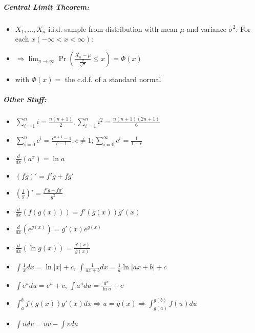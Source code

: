 \documentclass[landscape,10pt]{article}
\begin{document}
\begin{multicols}{4}
\subparagraph*{Central Limit Theorem:}
\begin{itemize}
    \item[] \(X_1,\ldots,X_n\) i.i.d. sample from distribution with mean \(\mu\) and variance \(\sigma^2\). For each \(x (-\infty < x < \infty):\)
    \item[] \(\Rightarrow \lim_{n \to \infty} \Pr \left( \frac{ \bar{X_n} - \mu }{ \frac{ \sigma }{ \sqrt{n} } }  \leq x \right) = \Phi(x)\)
    \item[] with \(\Phi(x) =\) the c.d.f. of a standard normal
\end{itemize}

    \subparagraph*{Other Stuff:}
    \begin{itemize}
        \item[] \(\sum\limits_{i=1}^{n}i = \frac{n(n+1)}{2},\sum\limits_{i=1}^{n}i^2 = \frac{n(n+1)(2n+1)}{6}\)
        \item[] \(\sum\limits_{i=0}^{n}c^i = \frac{c^{n+1}-1}{c-1}, c \neq 1; \sum\limits_{i=0}^{\infty}c^i = \frac{1}{1-c}\)
        \item[] \(\frac{d}{dx}(a^x) = \ln a\)
        \item[] \((fg)' = f'g + fg'\)
        \item[] \(\left(\frac{f}{g}\right)' = \frac{f'g-fg'}{g^2}\)
        \item[] \(\frac{d}{dx}(f(g(x)))=f'(g(x))g'(x)\)
        \item[] \(\frac{d}{dx}(e^{g(x)})= g'(x)e^{g(x)}\)
        \item[] \(\frac{d}{dx}(\ln g(x)) = \frac{g'(x)}{g(x)}\)
        \item[] \(\int \frac{1}{x}dx = \ln |x| + c\), \(\int \frac{1}{ax+b}dx=\frac{1}{a}\ln |ax+b|+c\)
        \item[] \(\int e^u du = e^u + c\), \(\int {a^u}du = \frac{a^u}{\ln a} + c\)
        \item[] \(\int_{a}^{b}{f(g(x))g'(x)}dx \Rightarrow u=g(x) \Rightarrow \int_{g(a)}^{g(b)}f(u)du\)
        \item[] \(\int udv = uv - \int vdu\)
    \end{itemize}

    


    \end{multicols}
\end{document}
